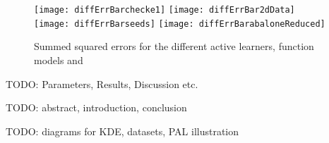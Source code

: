 \begin{figure}[h]
	\centering
	\texttt{[image: diffErrBarchecke1]}
	\texttt{[image: diffErrBar2dData]}
	\texttt{[image: diffErrBarseeds]}
	\texttt{[image: diffErrBarabaloneReduced]}
	\caption{Summed squared errors for the different active learners, function models and }
	\label{fig:meanErrorBars}
\end{figure}


TODO: Parameters, Results, Discussion etc.

TODO: abstract, introduction, conclusion

TODO: diagrams for KDE, datasets, PAL illustration
